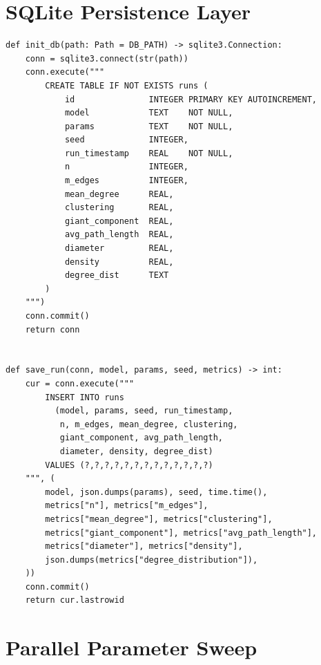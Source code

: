 \documentclass[12pt, a4paper]{report}
\theoremstyle{definition}
\theoremstyle{plain}
\theoremstyle{remark}
\begin{document}
\section{SQLite Persistence Layer}
\label{app:db}

\begin{lstlisting}[style=python,
    caption={Database initialisation and run storage. Each simulation
      run is written as a single row; \texttt{degree\_dist} is
      serialised as a JSON list of \texttt{[k, count]} pairs so that
      full degree sequences are recoverable without a separate table.},
    label={lst:db}]
def init_db(path: Path = DB_PATH) -> sqlite3.Connection:
    conn = sqlite3.connect(str(path))
    conn.execute("""
        CREATE TABLE IF NOT EXISTS runs (
            id               INTEGER PRIMARY KEY AUTOINCREMENT,
            model            TEXT    NOT NULL,
            params           TEXT    NOT NULL,
            seed             INTEGER,
            run_timestamp    REAL    NOT NULL,
            n                INTEGER,
            m_edges          INTEGER,
            mean_degree      REAL,
            clustering       REAL,
            giant_component  REAL,
            avg_path_length  REAL,
            diameter         REAL,
            density          REAL,
            degree_dist      TEXT
        )
    """)
    conn.commit()
    return conn


def save_run(conn, model, params, seed, metrics) -> int:
    cur = conn.execute("""
        INSERT INTO runs
          (model, params, seed, run_timestamp,
           n, m_edges, mean_degree, clustering,
           giant_component, avg_path_length,
           diameter, density, degree_dist)
        VALUES (?,?,?,?,?,?,?,?,?,?,?,?,?)
    """, (
        model, json.dumps(params), seed, time.time(),
        metrics["n"], metrics["m_edges"],
        metrics["mean_degree"], metrics["clustering"],
        metrics["giant_component"], metrics["avg_path_length"],
        metrics["diameter"], metrics["density"],
        json.dumps(metrics["degree_distribution"]),
    ))
    conn.commit()
    return cur.lastrowid
\end{lstlisting}

\section{Parallel Parameter Sweep}
\label{app:sweep}
\end{document}
